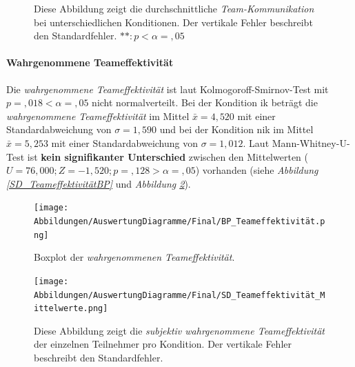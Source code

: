 \documentclass[a4paper,11pt]{article}%
\renewcommand{\\}{\vspace*{0.5\baselineskip} \newline}
\begin{document}
{\begin{figure}[H]
\begin{minipage}[t]{.5\linewidth}
      \caption[Durchschnittliche Team-Kommunikation]{Diese Abbildung zeigt die durchschnittliche \textit{Team-Kommunikation} bei unterschiedlichen Konditionen. Der vertikale Fehler beschreibt den Standardfehler. $** : p < \alpha = ,05$}
       \label{SD_Teamkommunikation_Mittelwerte}
   \end{minipage}
\end{figure}

\newpage

\paragraph{Wahrgenommene Teameffektivität}
Die \textit{wahrgenommene Teameffektivität} ist laut Kolmogoroff-Smirnov-Test mit $p =,018 < \alpha = ,05$ nicht normalverteilt. 
Bei der Kondition \ac{ik} beträgt die \textit{wahrgenommene Teameffektivität} im Mittel $\bar{x} = 4,520$ mit einer Standardabweichung von $\sigma = 1,590$ und bei der Kondition \ac{nik} im Mittel $\bar{x} = 5,253$ mit einer Standardabweichung von $\sigma = 1,012$. 
Laut Mann-Whitney-U-Test ist \textbf{kein signifikanter Unterschied} zwischen den Mittelwerten ($U = 76,000; Z = -1,520; p =,128 > \alpha = ,05$) vorhanden  (siehe \textit{Abbildung \ref{SD_TeameffektivitätBP}} und \textit{Abbildung \ref{SD_Teameffektivität_Mittelwerte}}).

		\begin{figure}[H]
   \begin{minipage}[t]{.5\linewidth} %
      \texttt{[image: Abbildungen/AuswertungDiagramme/Final/BP\_Teameffektivität.png]}
      \caption[Boxplot der wahrgenommenen Teameffektivität]{Boxplot der \textit{wahrgenommenen Teameffektivität}.}
            \label{SD_TeameffektivitätBP}
   \end{minipage}
   \hspace{.02\linewidth}%
   \begin{minipage}[t]{.5\linewidth} %
     \texttt{[image: Abbildungen/AuswertungDiagramme/Final/SD\_Teameffektivität\_Mittelwerte.png]}
      \caption[Durchschnittlich wahrgenommene Teameffektivität]{Diese Abbildung zeigt die \textit{subjektiv wahrgenommene Teameffektivität} der einzelnen Teilnehmer pro Kondition. Der vertikale Fehler beschreibt den Standardfehler.}
       \label{SD_Teameffektivität_Mittelwerte}
   \end{minipage}
\end{figure}

}
\end{document}
